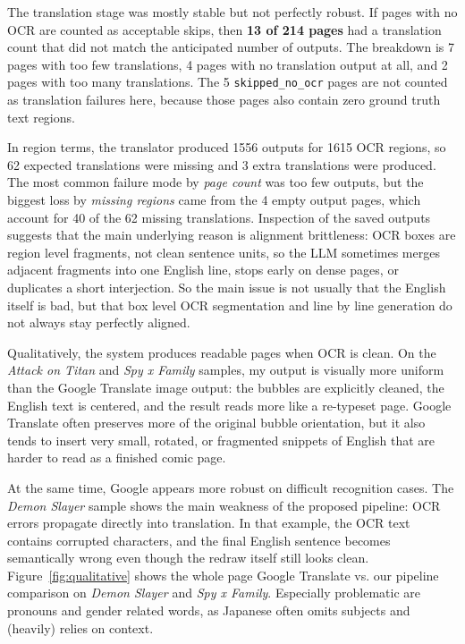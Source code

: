 \documentclass[10pt]{article}
\begin{document}
The translation stage was mostly stable but not perfectly robust. If pages with no OCR are counted as acceptable skips, then \textbf{13 of 214 pages} had a translation count that did not match the anticipated number of outputs. The breakdown is 7 pages with too few translations, 4 pages with no translation output at all, and 2 pages with too many translations. The 5 \texttt{skipped\_no\_ocr} pages are not counted as translation failures here, because those pages also contain zero ground truth text regions.

In region terms, the translator produced 1556 outputs for 1615 OCR regions, so 62 expected translations were missing and 3 extra translations were produced. The most common failure mode by \emph{page count} was too few outputs, but the biggest loss by \emph{missing regions} came from the 4 empty output pages, which account for 40 of the 62 missing translations. Inspection of the saved outputs suggests that the main underlying reason is alignment brittleness: OCR boxes are region level fragments, not clean sentence units, so the LLM sometimes merges adjacent fragments into one English line, stops early on dense pages, or duplicates a short interjection. So the main issue is not usually that the English itself is bad, but that box level OCR segmentation and line by line generation do not always stay perfectly aligned.

Qualitatively, the system produces readable pages when OCR is clean. On the \emph{Attack on Titan} and \emph{Spy x Family} samples, my output is visually more uniform than the Google Translate image output: the bubbles are explicitly cleaned, the English text is centered, and the result reads more like a re-typeset page. Google Translate often preserves more of the original bubble orientation, but it also tends to insert very small, rotated, or fragmented snippets of English that are harder to read as a finished comic page.

At the same time, Google appears more robust on difficult recognition cases. The \emph{Demon Slayer} sample shows the main weakness of the proposed pipeline: OCR errors propagate directly into translation. In that example, the OCR text contains corrupted characters, and the final English sentence becomes semantically wrong even though the redraw itself still looks clean. Figure~\ref{fig:qualitative} shows the whole page Google Translate vs. our pipeline comparison on \emph{Demon Slayer} and \emph{Spy x Family}. Especially problematic are pronouns and gender related words, as Japanese often omits subjects and (heavily) relies on context.
\end{document}
